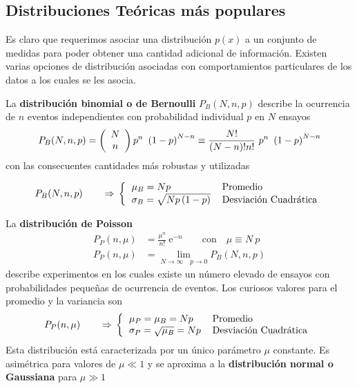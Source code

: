 \documentclass[spanish,titlepage,11pt]{article}
\begin{document}
\subsection{ Distribuciones Te\'{o}ricas m\'{a}s populares}

Es claro que requerimos asociar una distribuci\'{o}n $p(x)$ a un conjunto de
medidas para poder obtener una cantidad adicional de informaci\'{o}n. Existen
varias opciones de distribuci\'{o}n asociadas con comportamientos particulares
de los datos a los cuales se les asocia.

La \textbf{distribuci\'{o}n binomial o de Bernoulli} $P_{B}(N,n,p)$ describe
la o\-cu\-rren\-cia de $n$ eventos independientes con probabilidad individual
$p $ en $N$ ensayos
\[
P_{B}(N,n,p)=\left(
\begin{array}
[c]{c}%
N\\
n
\end{array}
\right)  p^{n}\ \left(  1-p\right)  ^{N-n}\equiv\frac{N!}{\left(  N-n\right)
!n!}\ p^{n}\ \left(  1-p\right)  ^{N-n}
\]
con las consecuentes cantidades m\'{a}s robustas y utilizadas%

\[
P_{B}(N,n,p)\qquad\Rightarrow\,\left\{
\begin{tabular}
[c]{ll}%
$\mu_{B}=Np$ & $\text{Promedio}$\\
$\sigma_{B}=\sqrt{Np\left(  1-p\right)  }$ & Desviaci\'{o}n Cuadr\'{a}tica
\end{tabular}
\right.
\]

La \textbf{distribuci\'{o}n de Poisson}
\begin{align*}
P_{P}(n,\mu)  &  =\frac{\mu^{n}}{n!}\ \mathrm{e}^{-n}\qquad\mathrm{con\quad
}\mu\equiv N\ p\\
P_{P}(n,\mu)  &  =\lim_{N\rightarrow\infty\quad p\rightarrow0}P_{B}(N,n,p)
\end{align*}
describe experimentos en los cuales existe un n\'{u}mero elevado de ensayos
con probabilidades peque\~{n}as de ocurrencia de eventos. Los curiosos valores
para el promedio y la variancia son
\[
P_{P}(n,\mu)\qquad\Rightarrow\,\left\{
\begin{tabular}
[c]{ll}%
$\mu_{P}=\mu_{B}=Np$ & $\text{Promedio}$\\
$\sigma_{P}=\sqrt{\mu_{B}}=Np$ & Desviaci\'{o}n Cuadr\'{a}tica
\end{tabular}
\right.
\]
Esta distribuci\'{o}n est\'{a} caracterizada por un \'{u}nico par\'{a}metro
$\mu$ constante. Es asim\'{e}trica para valores de $\mu\ll1$ y se aproxima a
la \textbf{distribuci\'{o}n normal o Gaussiana} para $\mu\gg1$
\end{document}
